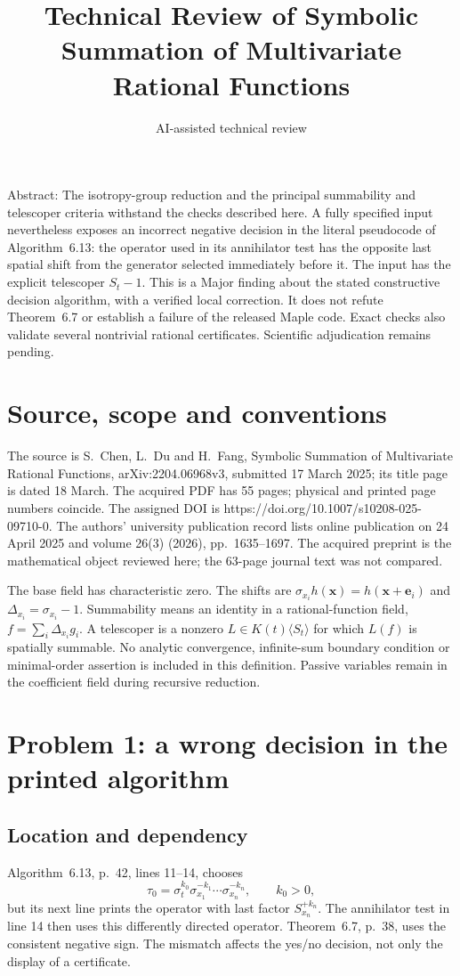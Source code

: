 \documentclass[10pt]{article}
\title{Technical Review of Symbolic Summation
of Multivariate Rational Functions}
\author{AI-assisted technical review}
\date{}
\begin{document}
\maketitle
Abstract: The isotropy-group reduction and the principal summability and telescoper criteria withstand the checks described here. A fully specified input nevertheless exposes an incorrect negative decision in the literal pseudocode of Algorithm 6.13: the operator used in its annihilator test has the opposite last spatial shift from the generator selected immediately before it. The input has the explicit telescoper \(S_t-1\). This is a Major finding about the stated constructive decision algorithm, with a verified local correction. It does not refute Theorem 6.7 or establish a failure of the released Maple code. Exact checks also validate several nontrivial rational certificates. Scientific adjudication remains pending.\par
\section*{Source, scope and conventions}
The source is S. Chen, L. Du and H. Fang, Symbolic Summation of Multivariate Rational Functions, arXiv:2204.06968v3, submitted 17 March 2025; its title page is dated 18 March. The acquired PDF has 55 pages; physical and printed page numbers coincide. The assigned DOI is https://doi.org/10.1007/s10208-025-09710-0. The authors’ university publication record lists online publication on 24 April 2025 and volume 26(3) (2026), pp. 1635–1697. The acquired preprint is the mathematical object reviewed here; the 63-page journal text was not compared.\par
The base field has characteristic zero. The shifts are \(\sigma_{x_i}h(\mathbf x)=h(\mathbf x+\mathbf e_i)\) and \(\Delta_{x_i}=\sigma_{x_i}-1\). Summability means an identity in a rational-function field, \(f=\sum_i\Delta_{x_i}g_i\). A telescoper is a nonzero \(L\in K(t)\langle S_t\rangle\) for which \(L(f)\) is spatially summable. No analytic convergence, infinite-sum boundary condition or minimal-order assertion is included in this definition. Passive variables remain in the coefficient field during recursive reduction.\par
\section*{Problem 1: a wrong decision in the printed algorithm}
\subsection*{Location and dependency}
Algorithm 6.13, p. 42, lines 11–14, chooses \[\tau_0=\sigma_t^{k_0}\sigma_{x_1}^{-k_1}
                   \cdots\sigma_{x_n}^{-k_n},\qquad k_0>0,\] but its next line prints the operator with last factor \(S_{x_n}^{+k_n}\). The annihilator test in line 14 then uses this differently directed operator. Theorem 6.7, p. 38, uses the consistent negative sign. The mismatch affects the yes/no decision, not only the display of a certificate.\par
\end{document}
